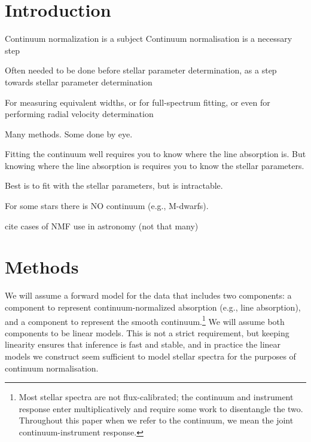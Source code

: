 \documentclass[modern]{aastex631}
\begin{document}

\section*{}\clearpage
\section{Introduction}\label{sec:intro}

Continuum normalization is a subject
Continuum normalisation is a necessary step

Often needed to be done before stellar parameter determination, as a step towards stellar parameter determination

For measuring equivalent widths, or for full-spectrum fitting, or even for performing radial velocity determination

Many methods. Some done by eye.

Fitting the continuum well requires you to know where the line absorption is. But knowing where the line absorption is requires you to know the stellar parameters.

Best is to fit with the stellar parameters, but is intractable.

For some stars there is NO continuum (e.g., M-dwarfs). 

cite cases of NMF use in astronomy (not that many)


\section{Methods}\label{sec:methods}

We will assume a forward model for the data that includes two components: a component to represent continuum-normalized absorption (e.g., line absorption), and a component to represent the smooth continuum.\footnote{Most stellar spectra are not flux-calibrated; the continuum and instrument response enter multiplicatively and require some work to disentangle the two. Throughout this paper when we refer to the continuum, we mean the joint continuum-instrument response.} We will assume both components to be linear models. This is not a strict requirement, but keeping linearity ensures that  inference is fast and stable, and in practice the linear models we construct seem sufficient to model stellar spectra for the purposes of continuum normalisation.\\
\end{document}
